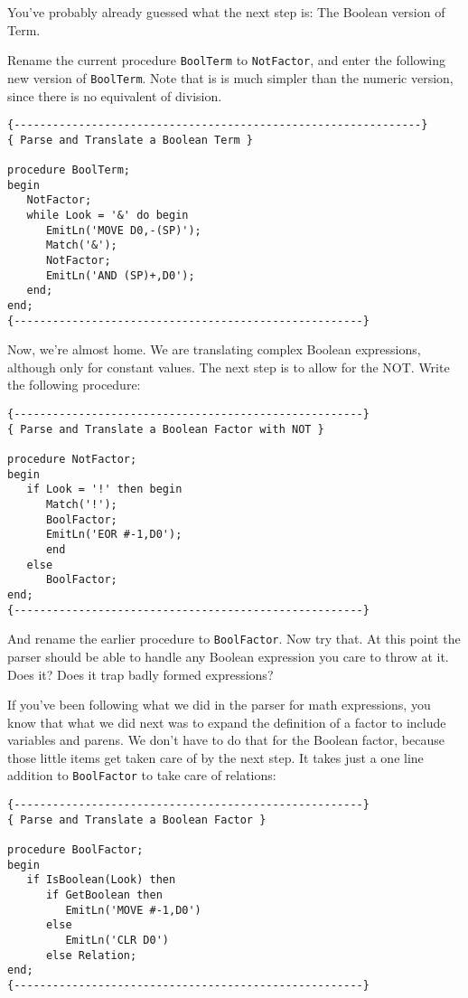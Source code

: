 You've  probably  already  guessed  what  the next step  is:  The Boolean version of Term.

Rename the current procedure {\tt BoolTerm} to {\tt NotFactor}, and enter the following new version of {\tt BoolTerm}. Note that is is  much simpler than  the  numeric  version, since  there  is  no equivalent  of division.

\begin{verbatim}
{---------------------------------------------------------------}
{ Parse and Translate a Boolean Term }

procedure BoolTerm;
begin
   NotFactor;
   while Look = '&' do begin
      EmitLn('MOVE D0,-(SP)');
      Match('&');
      NotFactor;
      EmitLn('AND (SP)+,D0');
   end;
end;
{------------------------------------------------------}
\end{verbatim}

Now, we're  almost  home. We are  translating  complex  Boolean expressions, although only for constant values. The next step is to allow for the NOT. Write the following procedure:

\begin{verbatim}
{------------------------------------------------------}
{ Parse and Translate a Boolean Factor with NOT }

procedure NotFactor;
begin
   if Look = '!' then begin
      Match('!');
      BoolFactor;
      EmitLn('EOR #-1,D0');
      end
   else
      BoolFactor;
end;
{------------------------------------------------------}
\end{verbatim}

And  rename  the  earlier procedure to {\tt BoolFactor}. Now try that. At this point  the  parser  should  be able to handle any Boolean expression you care to throw at it. Does it?  Does it trap badly formed expressions?

If you've  been  following  what  we  did  in the parser for math expressions, you know  that  what  we  did next was to expand the definition of a factor to include variables and parens. We don't have  to do that for the Boolean  factor, because  those  little items get taken care of by the next step. It  takes  just  a one line addition to {\tt BoolFactor} to take care of relations:

\begin{verbatim}
{------------------------------------------------------}
{ Parse and Translate a Boolean Factor }

procedure BoolFactor;
begin
   if IsBoolean(Look) then
      if GetBoolean then
         EmitLn('MOVE #-1,D0')
      else
         EmitLn('CLR D0')
      else Relation;
end;
{------------------------------------------------------}
\end{verbatim}

